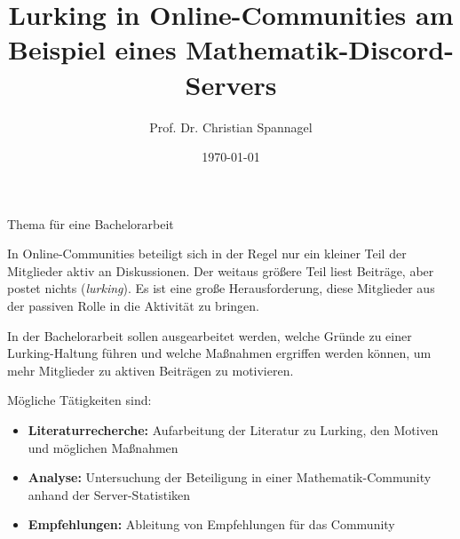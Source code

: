 \documentclass{../cssheet}
\title{Lurking in Online-Communities am Beispiel eines Mathematik-Discord-Servers}
\author{Prof. Dr. Christian Spannagel}
\date{\today}
\begin{document}
\vspace*{5mm}
\begin{center}
{\Large Thema für eine Bachelorarbeit}
\end{center}

\printtitle
\vspace*{1cm}

In Online-Communities beteiligt sich in der Regel nur ein kleiner Teil der Mitglieder aktiv an Diskussionen. Der weitaus größere Teil liest Beiträge, aber postet nichts (\emph{lurking}). Es ist eine große Herausforderung, diese Mitglieder aus der passiven Rolle in die Aktivität zu bringen.

In der Bachelorarbeit sollen ausgearbeitet werden, welche Gründe zu einer Lurking-Haltung führen und welche Maßnahmen ergriffen werden können, um mehr Mitglieder zu aktiven Beiträgen zu motivieren.

Mögliche Tätigkeiten sind:
\begin{itemize}
\item \textbf{Literaturrecherche:} Aufarbeitung der Literatur zu Lurking, den Motiven und möglichen Maßnahmen
\item \textbf{Analyse:} Untersuchung der Beteiligung in einer Mathematik-Community anhand der Server-Statistiken
\item \textbf{Empfehlungen:} Ableitung von Empfehlungen für das Community
\end{itemize}

\vspace*{10mm}

\printlicense

\printsocials
\end{document}
